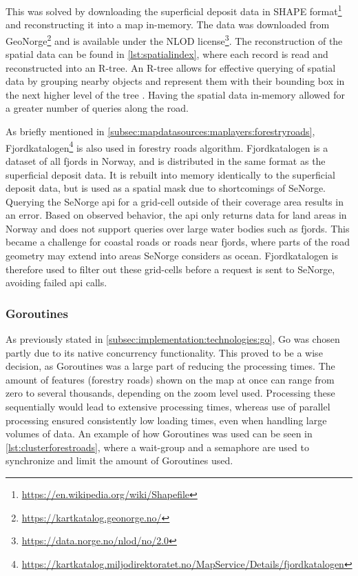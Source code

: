 This was solved by downloading the superficial deposit data in SHAPE format\footnote{\url{https://en.wikipedia.org/wiki/Shapefile}} and reconstructing it into a map in-memory. The data was downloaded from GeoNorge\footnote{\url{https://kartkatalog.geonorge.no/}} and is available under the NLOD license\footnote{\url{https://data.norge.no/nlod/no/2.0}}. The reconstruction of the spatial data can be found in \autoref{lst:spatialindex}, where each record is read and reconstructed into an R-tree. An R-tree allows for effective querying of spatial data by grouping nearby objects and represent them with their bounding box in the next higher level of the tree \cite{rtreewikipedia}. Having the spatial data in-memory allowed for a greater number of queries along the road.

\begin{figure}[h]

\end{figure}

As briefly mentioned in \autoref{subsec:mapdatasources:maplayers:forestryroads}, Fjordkatalogen\footnote{\url{https://kartkatalog.miljodirektoratet.no/MapService/Details/fjordkatalogen}} is also used in forestry roads algorithm. Fjordkatalogen is a dataset of all fjords in Norway, and is distributed in the same format as the superficial deposit data. It is rebuilt into memory identically to the superficial deposit data, but is used as a spatial mask due to shortcomings of SeNorge. Querying the SeNorge \acrshort{api} for a grid-cell outside of their coverage area results in an error. Based on observed behavior, the \acrshort{api} only returns data for land areas in Norway and does not support queries over large water bodies such as fjords. This became a challenge for coastal roads or roads near fjords, where parts of the road geometry may extend into areas SeNorge considers as ocean. Fjordkatalogen is therefore used to filter out these grid-cells before a request is sent to SeNorge, avoiding failed \acrshort{api} calls.

\subsubsection{Goroutines}

As previously stated in \autoref{subsec:implementation:technologies:go}, Go was chosen partly due to its native concurrency functionality. This proved to be a wise decision, as Goroutines was a large part of reducing the processing times. The amount of features (forestry roads) shown on the map at once can range from zero to several thousands, depending on the zoom level used. Processing these sequentially would lead to extensive processing times, whereas use of parallel processing ensured consistently low loading times, even when handling large volumes of data. An example of how Goroutines was used can be seen in \autoref{lst:clusterforestroads}, where a wait-group and a semaphore are used to synchronize and limit the amount of Goroutines used.
